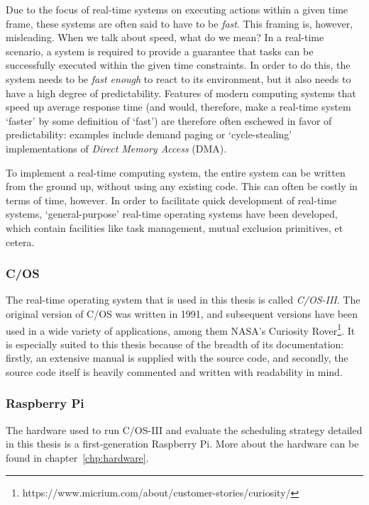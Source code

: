 \documentclass[twoside]{uva-inf-bachelor-thesis}
\newcommand{\ucosiii}{\textmu C/OS-III\xspace}
\newcommand{\ucos}{\textmu C/OS\xspace}
\begin{document}
Due to the focus of real-time systems on executing actions within a given time frame, these systems are often said to have to be \textit{fast}. This framing is, however, misleading. When we talk about speed, what do we mean? In a real-time scenario, a system is required to provide a guarantee that tasks can be successfully executed within the given time constraints. In order to do this, the system needs to be \textit{fast enough} to react to its environment, but it also needs to have a high degree of predictability. Features of modern computing systems that speed up average response time (and would, therefore, make a real-time system `faster' by some definition of `fast') are therefore often eschewed in favor of predictability: examples include demand paging or `cycle-stealing' implementations of \textit{Direct Memory Access} (DMA).

To implement a real-time computing system, the entire system can be written from the ground up, without using any existing code. This can often be costly in terms of time, however. In order to facilitate quick development of real-time systems, `general-purpose' real-time operating systems have been developed, which contain facilities like task management, mutual exclusion primitives, et cetera.

\subsubsection{\ucos} \label{sec:ucos}
The real-time operating system that is used in this thesis is called \textit{\ucosiii}. The original version of \ucos was written in 1991, and subsequent versions have been used in a wide variety of applications, among them NASA's Curiosity Rover\footnote{https://www.micrium.com/about/customer-stories/curiosity/}. It is especially suited to this thesis because of the breadth of its documentation: firstly, an extensive manual \cite{micrium:ucosmanual} is supplied with the source code, and secondly, the source code itself is heavily commented and written with readability in mind.

\subsubsection{Raspberry Pi}
The hardware used to run \ucosiii and evaluate the scheduling strategy detailed in this thesis is a first-generation Raspberry Pi. More about the hardware can be found in chapter~\ref{chp:hardware}.
\end{document}
